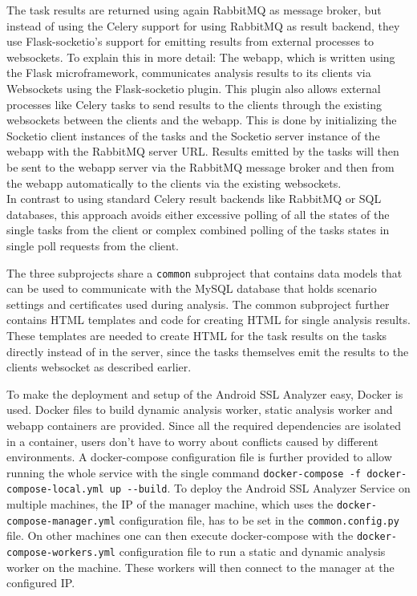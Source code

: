 \documentclass[draft,final]{vutinfth} %
\begin{document}
The task results are returned using again RabbitMQ as message broker, but instead of using the Celery support for using RabbitMQ as result backend, they use Flask-socketio's \cite{Flask-socketio} support for emitting results from external processes to websockets. To explain this in more detail: The webapp, which is written using the Flask \cite{Flask} microframework, communicates analysis results to its clients via Websockets using the Flask-socketio plugin. This plugin also allows external processes like Celery tasks to send results to the clients through the existing websockets between the clients and the webapp. This is done by initializing the Socketio client instances of the tasks and the Socketio server instance of the webapp with the RabbitMQ server URL. Results emitted by the tasks will then be sent to the webapp server via the RabbitMQ message broker and then from the webapp automatically to the clients via the existing websockets.\\
In contrast to using standard Celery result backends like RabbitMQ or SQL databases, this approach avoids either excessive polling of all the states of the single tasks from the client or complex combined polling of the tasks states in single poll requests from the client.

The three subprojects share a \texttt{common} subproject that contains data models that can be used to communicate with the MySQL database that holds scenario settings and certificates used during analysis. The common subproject further contains HTML templates and code for creating HTML for single analysis results.  These templates are needed to create HTML for the task results on the tasks directly instead of in the server, since the tasks themselves emit the results to the clients websocket as described earlier.  

To make the deployment and setup of the Android SSL Analyzer easy, Docker \cite{Docker} is used. Docker files to build dynamic analysis worker, static analysis worker and webapp containers are provided. Since all the required dependencies are isolated in a container, users don't have to worry about conflicts caused by different environments. A docker-compose configuration file \cite{DockerCompose} is further provided to allow running the whole service with the single command \texttt{docker-compose -f docker-compose-local.yml up -{}-build}. To deploy the Android SSL Analyzer Service on multiple machines, the IP of the manager machine, which uses the \texttt{docker-compose-manager.yml} configuration file, has to be set in the \texttt{common.config.py} file. On other machines one can then execute docker-compose with the \texttt{docker-compose-workers.yml} configuration file to run a static and dynamic analysis worker on the machine. These workers will then connect to the manager at the configured IP.
\end{document}
